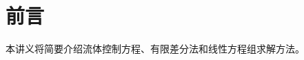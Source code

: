 \chapter*{前言}
\thispagestyle{empty}
\pagestyle{empty}
本讲义将简要介绍流体控制方程、有限差分法和线性方程组求解方法。
\cleardoublepage
